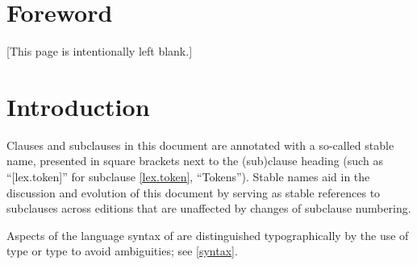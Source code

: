 
\chapter{Foreword}

[This page is intentionally left blank.]

\chapter{Introduction}

Clauses and subclauses in this document are annotated
with a so-called stable name,
presented in square brackets next to the (sub)clause heading
(such as ``[lex.token]'' for subclause \ref{lex.token}, ``Tokens'').
Stable names aid in the discussion and evolution of this document
by serving as stable references to subclauses across editions
that are unaffected by changes of subclause numbering.

Aspects of the language syntax of \Cpp{} are distinguished typographically
by the use of  type
or  type to avoid ambiguities; see \ref{syntax}.

